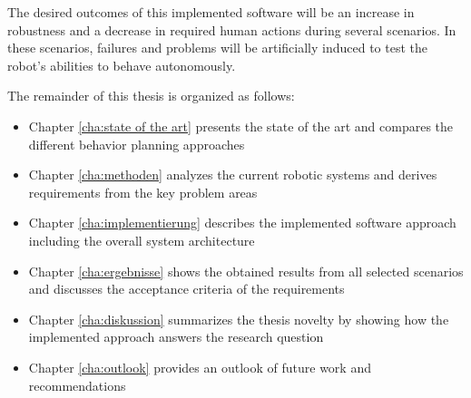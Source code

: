 The desired outcomes of this implemented software will be an increase in robustness and a decrease in required human actions during several scenarios. In these scenarios, failures and problems will be artificially induced to test the robot's abilities to behave autonomously. 

The remainder of this thesis is organized as follows:

\begin{itemize}
	\item Chapter \ref{cha:state of the art} presents the state of the art and compares the different behavior planning approaches
	
	\item Chapter \ref{cha:methoden} analyzes the current robotic systems and derives requirements from the key problem areas
	
	\item Chapter \ref{cha:implementierung} describes the implemented software approach including the overall system architecture 
	
	\item Chapter \ref{cha:ergebnisse} shows the obtained results from all selected scenarios and discusses the acceptance criteria of the requirements 
	
	\item Chapter \ref{cha:diskussion} summarizes the thesis novelty by showing how the implemented approach answers the research question
	
	\item Chapter \ref{cha:outlook} provides an outlook of future work and recommendations
\end{itemize}


